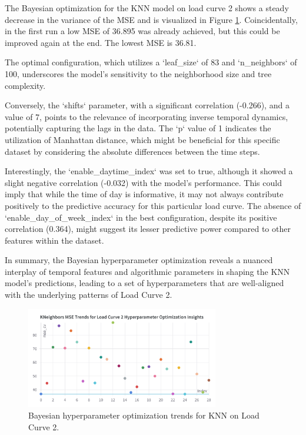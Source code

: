 \documentclass{article} %
\begin{document}
The Bayesian optimization for the \gls*{KNN} model on load curve 2 shows a steady decrease in the variance of the \gls*{MSE} and is visualized in Figure \ref{fig:knn_lc2}. Coincidentally, in the first run a low MSE of 36.895 was already achieved, but this could be improved again at the end. The lowest MSE is 36.81.

The optimal configuration, which utilizes a `leaf\_size` of 83 and `n\_neighbors` of 100, underscores the model's sensitivity to the neighborhood size and tree complexity. 

Conversely, the `shifts` parameter, with a significant correlation (-0.266), and a value of 7, points to the relevance of incorporating inverse temporal dynamics, potentially capturing the lags in the data. The `p` value of 1 indicates the utilization of Manhattan distance, which might be beneficial for this specific dataset by considering the absolute differences between the time steps.

Interestingly, the `enable\_daytime\_index` was set to true, although it showed a slight negative correlation (-0.032) with the model's performance. This could imply that while the time of day is informative, it may not always contribute positively to the predictive accuracy for this particular load curve. The absence of `enable\_day\_of\_week\_index` in the best configuration, despite its positive correlation (0.364), might suggest its lesser predictive power compared to other features within the dataset.

In summary, the Bayesian hyperparameter optimization reveals a nuanced interplay of temporal features and algorithmic parameters in shaping the \gls*{KNN} model's predictions, leading to a set of hyperparameters that are well-aligned with the underlying patterns of Load Curve 2.

\begin{figure}[H]
    \centering
    \includegraphics[width=0.75\textwidth]{ressources/Hyperparams/KNN/KNeighbors MSE Trends for Load Curve 2 Hyperparameter Optimization Insights.png}
    \caption{Bayesian hyperparameter optimization trends for KNN on Load Curve 2.}
    \label{fig:knn_lc2}
\end{figure}
\end{document}
